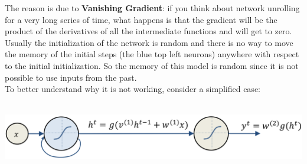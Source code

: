 The reason is due to \textbf{Vanishing Gradient}: if you think about network unrolling for a very long series of time, what happens is that the gradient will be the product of the derivatives of all the intermediate functions and will get to zero.\\
Usually the initialization of the network is random and there is no way to move the memory of the initial steps (the blue top left neurons) anywhere with respect to the initial initialization. So the memory of this model is random since it is not possible to use inputs from the past. \\ 

To better understand why it is not working, consider a simplified case: \\ \\
\vspace{0.2cm}
\begin{minipage}{\linewidth}
        \centering
        \includegraphics[width=15cm]{images/simplified_rnn.png}
        \label{fig:sim_rnn}
\end{minipage}
\vspace{0.2cm}

